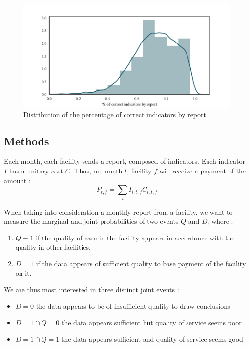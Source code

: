 \begin{center}
\begin{figure}[ht]
\includegraphics[width=\textwidth]{figure/correct_dist.pdf}
\caption{Distribution of the percentage of correct indicators by report}
\end{figure}
\end{center}

\subsection{Methods}
\label{sec:models}

Each month, each facility sends a report, composed of indicators. Each indicator $I$ has a unitary cost $C$. Thus, on month $t$, facility $f$ will receive a payment of the amount :
$$P_{t,f} = \sum_i I_{i,t,f} C_{i,t,f}$$

When taking into consideration a monthly report from a facility, we want to measure the marginal and joint probabilities of two events $Q$ and $D$, where :
\begin{enumerate}
	\item $Q = 1$ if the quality of care in the facility appears in accordance with the quality in other facilities.
	\item $D = 1$ if the data appears of sufficient quality to base payment of the facility on it.
\end{enumerate}

We are thus most interested in three distinct joint events :
\begin{itemize}
	\item $D = 0$ the data appears to be of insufficient quality to draw conclusions
	\item $D = 1 \cap Q = 0$ the data appears sufficient but quality of service seems poor
	\item $D = 1 \cap Q = 1$ the data appears sufficient and quality of service seems good
\end{itemize}


